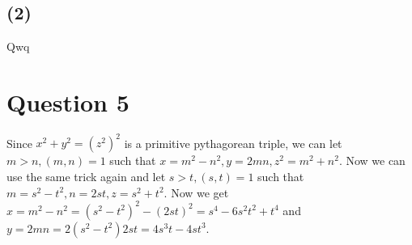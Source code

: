 \documentclass{article}
\begin{document}
\subsection*{(2)}
Qwq
\section*{Question 5}
Since $ x^2 + y^2 = (z^2)^2 $ is a primitive pythagorean triple, we can let $ m > n, (m, n) = 1 $ such that $ x = m^2 - n^2, y = 2mn, z^2 = m^2 + n^2 $. Now we can use the same trick again and let $ s > t, (s, t) = 1 $ such that $ m = s^2 - t^2, n = 2st, z = s^2 + t^2 $. Now we get $ x = m^2 - n^2 = (s^2 - t^2)^2 - (2st)^2 = s^4 - 6s^2t^2 + t^4 $ and $ y = 2mn = 2(s^2 - t^2)2st = 4s^3t - 4st^3 $.
\end{document}
